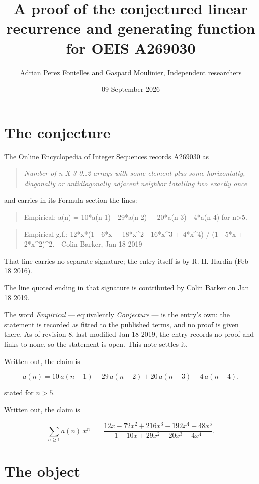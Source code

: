 \documentclass[11pt]{article}
\title{A proof of the conjectured linear recurrence and generating function for OEIS A269030}
\author{Adrian Perez Fontelles and Gaspard Moulinier, Independent researchers}
\date{09 September 2026}
\theoremstyle{definition}
\begin{document}
\maketitle
\section{The conjecture}

The Online Encyclopedia of Integer Sequences records \href{https://oeis.org/A269030}{A269030} as

\begin{quote}\itshape Number of n X 3 0..2 arrays with some element plus some horizontally, diagonally or antidiagonally adjacent neighbor totalling two exactly once\end{quote}

and carries in its Formula section the lines:

\begin{quote}\ttfamily Empirical: a(n) = 10*a(n-1) - 29*a(n-2) + 20*a(n-3) - 4*a(n-4) for n>5.\end{quote}

\begin{quote}\ttfamily Empirical g.f.: 12*x*(1 - 6*x + 18*x\textasciicircum{}2 - 16*x\textasciicircum{}3 + 4*x\textasciicircum{}4) / (1 - 5*x + 2*x\textasciicircum{}2)\textasciicircum{}2. - Colin Barker, Jan 18 2019\end{quote}

That line carries no separate signature; the entry itself is by R. H. Hardin (Feb 18 2016).

The line quoted ending in that signature is contributed by Colin Barker on Jan 18 2019.

The word {\itshape Empirical} --- equivalently {\itshape Conjecture} --- is the entry's own: the statement is recorded as fitted to the published terms, and no proof is given there. As of revision 8, last modified Jan 18 2019, the entry records no proof and links to none, so the statement is open. This note settles it.

Written out, the claim is

\[a(n) = 10\,a(n-1) - 29\,a(n-2) + 20\,a(n-3) - 4\,a(n-4).\]

stated for $n > 5$.

Written out, the claim is

\[\sum_{n \ge 1} a(n)\,x^n \;=\; \frac{12x - 72x^{2} + 216x^{3} - 192x^{4} + 48x^{5}}{1 - 10x + 29x^{2} - 20x^{3} + 4x^{4}}.\]

\section{The object}
\end{document}
